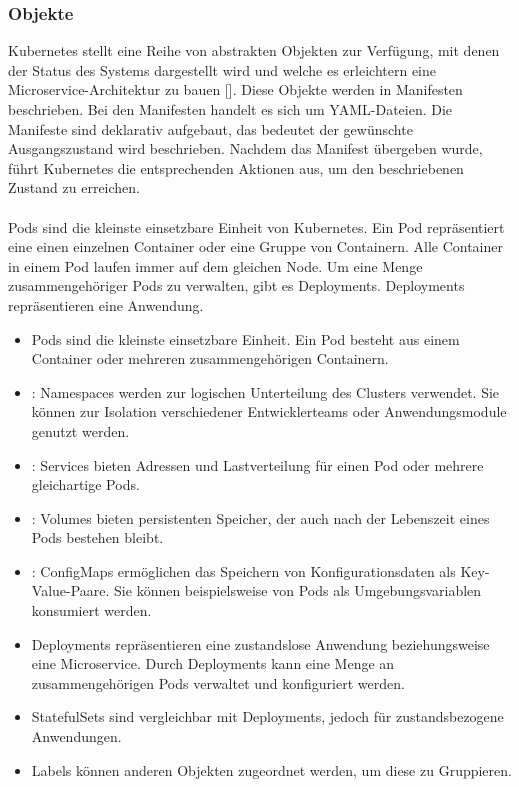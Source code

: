 \subsubsection{Objekte}

Kubernetes stellt eine Reihe von abstrakten Objekten zur Verfügung, mit denen der Status des Systems dargestellt wird und welche es erleichtern eine Microservice-Architektur zu bauen [\cite[S. 13]{hightowerKubernetes2018}]. Diese Objekte werden in Manifesten beschrieben. Bei den Manifesten handelt es sich um YAML-Dateien. Die Manifeste sind deklarativ aufgebaut, das bedeutet der gewünschte Ausgangszustand wird beschrieben. Nachdem das Manifest übergeben wurde, führt Kubernetes die entsprechenden Aktionen aus, um den beschriebenen Zustand zu erreichen. \\
\\
Pods sind die kleinste einsetzbare Einheit von Kubernetes. Ein Pod repräsentiert eine einen einzelnen Container oder eine Gruppe von Containern. Alle Container in einem Pod laufen immer auf dem gleichen Node. Um eine Menge zusammengehöriger Pods zu verwalten, gibt es Deployments. Deployments repräsentieren eine Anwendung. 

\begin{itemize}
\item Pods sind die kleinste einsetzbare Einheit. Ein Pod besteht aus einem Container oder mehreren zusammengehörigen Containern.
\item: Namespaces werden zur logischen Unterteilung des Clusters verwendet. Sie können zur Isolation verschiedener Entwicklerteams oder Anwendungsmodule genutzt werden.
\item: Services bieten Adressen und Lastverteilung für einen Pod oder mehrere gleichartige Pods.
\item: Volumes bieten persistenten Speicher, der auch nach der Lebenszeit eines Pods bestehen bleibt.
\item: ConfigMaps ermöglichen das Speichern von Konfigurationsdaten als Key-Value-Paare. Sie können beispielsweise von Pods als Umgebungsvariablen konsumiert werden.
\item Deployments repräsentieren eine zustandslose Anwendung beziehungsweise eine Microservice. Durch Deployments kann eine Menge an zusammengehörigen Pods verwaltet und konfiguriert werden. 
\item StatefulSets sind vergleichbar mit Deployments, jedoch für zustandsbezogene Anwendungen.
\item Labels können anderen Objekten zugeordnet werden, um diese zu Gruppieren.
\end{itemize}

